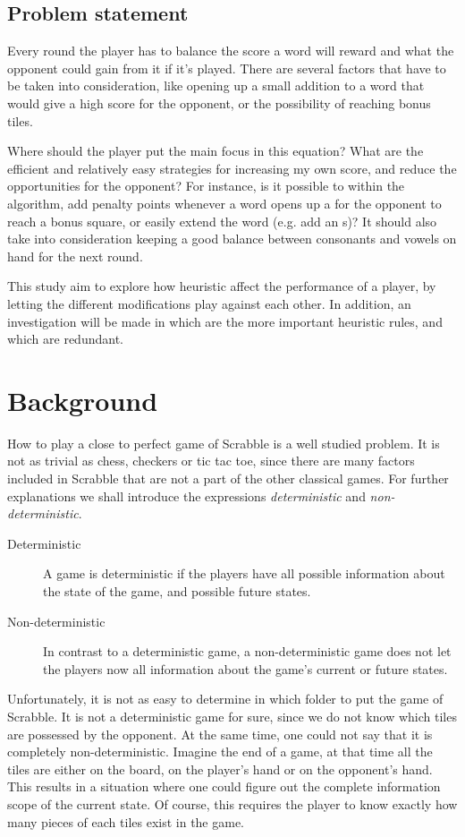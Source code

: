 \documentclass[a4paper, 12pt]{report}
\begin{document}
\section{Problem statement}
Every round the player has to balance the score a word will reward and what the opponent could gain from it if it’s played. There are several factors that have to be taken into consideration, like opening up a small addition to a word that would give a high score for the opponent, or the possibility of reaching bonus tiles.



Where should the player put the main focus in this equation? What are the efficient and relatively easy strategies for increasing my own score, and reduce the opportunities for the opponent? For instance, is it possible to within the algorithm, add penalty points whenever a word opens up a for the opponent to reach a bonus square, or easily extend the word (e.g. add an s)? It should also take into consideration keeping a good balance between consonants and vowels on hand for the next round.

This study aim to explore how heuristic affect the performance of a player, by letting the different modifications play against each other. In addition, an investigation will be made in which are the more important heuristic rules, and which are redundant.

\chapter{Background}
How to play a close to perfect game of Scrabble is a well studied problem. It is not as trivial as chess, checkers or tic tac toe, since there are many factors included in Scrabble that are not a part of the other classical games. For further explanations we shall introduce the expressions \emph{deterministic} and \emph{non-deterministic}. 

\begin{description}
\item[Deterministic] A game is deterministic if the players have all possible information about the state of the game, and possible future states.
\item[Non-deterministic] In contrast to a deterministic game, a non-deterministic game does not let the players now all information about the game's current or future states.
\end{description}

Unfortunately, it is not as easy to determine in which folder to put the game of Scrabble. It is not a deterministic game for sure, since we do not know which tiles are possessed by the opponent. At the same time, one could not say that it is completely non-deterministic. Imagine the end of a game, at that time all the tiles are either on the board, on the player's hand or on the opponent's hand. This results in a situation where one could figure out the complete information scope of the current state. Of course, this requires the player to know exactly how many pieces of each tiles exist in the game.
\end{document}
